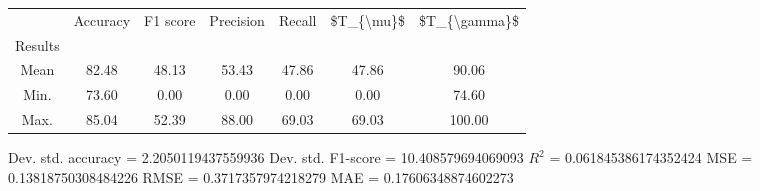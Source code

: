 \begin{tabular}{|c|c|c|c|c|c|c|}
\toprule
{} &  Accuracy &  F1 score &  Precision &  Recall &  \$T\_\{\textbackslash mu\}\$ &  \$T\_\{\textbackslash gamma\}\$ \\
Results &           &           &            &         &            &               \\
\hline
Mean    &     82.48 &     48.13 &      53.43 &   47.86 &      47.86 &         90.06 \\
Min.    &     73.60 &      0.00 &       0.00 &    0.00 &       0.00 &         74.60 \\
Max.    &     85.04 &     52.39 &      88.00 &   69.03 &      69.03 &        100.00 \\
\bottomrule
\end{tabular}

 Dev. std. accuracy = 2.2050119437559936
 Dev. std. F1-score = 10.408579694069093
 $R^2$ = 0.061845386174352424
 MSE = 0.13818750308484226
 RMSE = 0.3717357974218279
 MAE = 0.17606348874602273